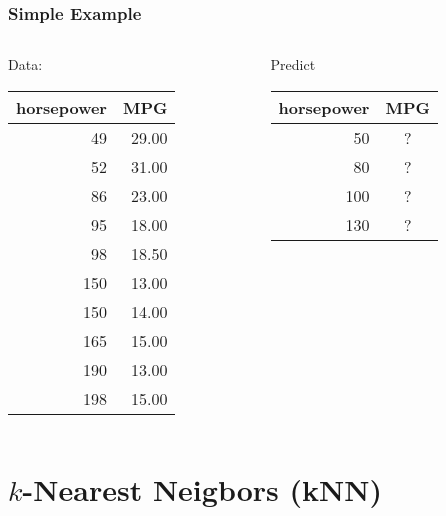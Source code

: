 \documentclass[mathserif, xcolor=table, svgnames]{beamer}
\begin{document}
\begin{frame}
  \frametitle{Simple Example}
  \begin{columns}
    \begin{column}{0.5\linewidth}
      \begin{center}
        Data:\\
        \begin{tabular}{rr}
          \toprule
          horsepower & MPG\\
          \midrule
          49 & 29.00 \\ 
          52 & 31.00 \\ 
          86 & 23.00 \\ 
          95 & 18.00 \\ 
          98 & 18.50 \\ 
          150 & 13.00 \\ 
          150 & 14.00 \\ 
          165 & 15.00 \\ 
          190 & 13.00 \\ 
          198 & 15.00 \\ 
          \bottomrule
        \end{tabular}
      \end{center}
    \end{column}
    \begin{column}{0.5\linewidth}
      \begin{center}
        Predict\\
        \begin{tabular}{rc}
          \toprule
          horsepower & MPG\\
          \midrule
          50 & ?\\
          80 & ?\\
          100 & ?\\
          130 & ?\\
          \bottomrule
        \end{tabular}
      \end{center}
    \end{column}
  \end{columns}
\end{frame}

\section{$k$-Nearest Neigbors (kNN)}
\frame{\tableofcontents[currentsection]}

{

}
\end{document}
